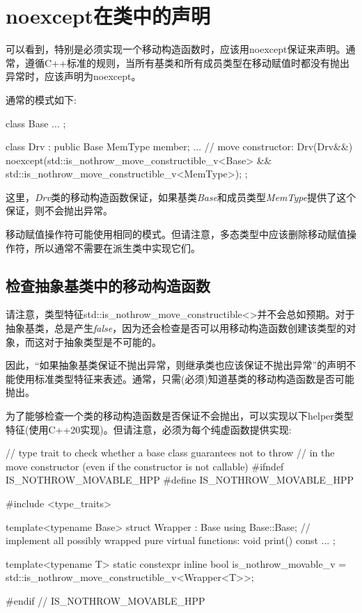 \section{noexcept在类中的声明}
可以看到，特别是必须实现一个移动构造函数时，应该用noexcept保证来声明。通常，遵循C++标准的规则，当所有基类和所有成员类型在移动赋值时都没有抛出异常时，应该声明为noexcept。

通常的模式如下:

\begin{cppcode}
class Base {
	...
};

class Drv : public Base {
	MemType member;
	...
	// move constructor:
	Drv(Drv&&) noexcept(std::is_nothrow_move_constructible_v<Base> &&
	std::is_nothrow_move_constructible_v<MemType>);
};
\end{cppcode}

这里，\textit{Drv}类的移动构造函数保证，如果基类\textit{Base}和成员类型\textit{MemType}提供了这个保证，则不会抛出异常。

移动赋值操作符可能使用相同的模式。但请注意，多态类型中应该删除移动赋值操作符，所以通常不需要在派生类中实现它们。

\subsection{检查抽象基类中的移动构造函数}

请注意，类型特征std::is_nothrow_move_constructible<>并不会总如预期。对于抽象基类，总是产生\textit{false}，因为还会检查是否可以用移动构造函数创建该类型的对象，而这对于抽象类型是不可能的。

因此，“如果抽象基类保证不抛出异常，则继承类也应该保证不抛出异常”的声明不能使用标准类型特征来表述。通常，只需(必须)知道基类的移动构造函数是否可能抛出。

为了能够检查一个类的移动构造函数是否保证不会抛出，可以实现以下helper类型特征(使用C++20实现)。但请注意，必须为每个纯虚函数提供实现:

\begin{cppcode}
// type trait to check whether a base class guarantees not to throw
// in the move constructor (even if the constructor is not callable)
#ifndef IS_NOTHROW_MOVABLE_HPP
#define IS_NOTHROW_MOVABLE_HPP

#include <type_traits>

template<typename Base>
struct Wrapper : Base {
	using Base::Base;
	// implement all possibly wrapped pure virtual functions:
	void print() const {}
	...
};

template<typename T>
static constexpr inline bool is_nothrow_movable_v
	= std::is_nothrow_move_constructible_v<Wrapper<T>>;

#endif // IS_NOTHROW_MOVABLE_HPP
\end{cppcode}

